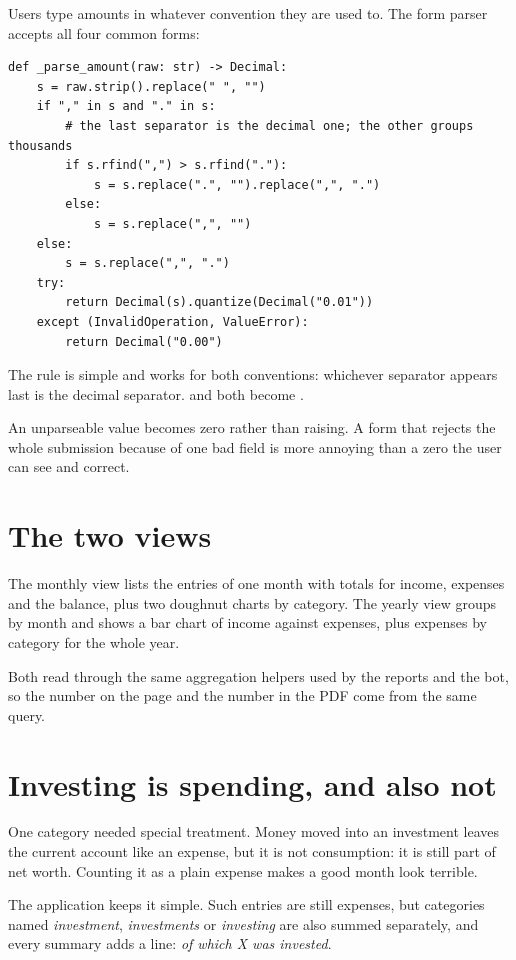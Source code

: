 Users type amounts in whatever convention they are used to. The form parser
accepts all four common forms:

\begin{lstlisting}[style=py]
def _parse_amount(raw: str) -> Decimal:
    s = raw.strip().replace(" ", "")
    if "," in s and "." in s:
        # the last separator is the decimal one; the other groups thousands
        if s.rfind(",") > s.rfind("."):
            s = s.replace(".", "").replace(",", ".")
        else:
            s = s.replace(",", "")
    else:
        s = s.replace(",", ".")
    try:
        return Decimal(s).quantize(Decimal("0.01"))
    except (InvalidOperation, ValueError):
        return Decimal("0.00")
\end{lstlisting}

The rule is simple and works for both conventions: whichever separator appears
last is the decimal separator.  and  both become
.

An unparseable value becomes zero rather than raising. A form that rejects the
whole submission because of one bad field is more annoying than a zero the user
can see and correct.

\section{The two views}

The monthly view lists the entries of one month with totals for income,
expenses and the balance, plus two doughnut charts by category. The yearly view
groups by month and shows a bar chart of income against expenses, plus expenses
by category for the whole year.

Both read through the same aggregation helpers used by the reports and the bot,
so the number on the page and the number in the PDF come from the same query.

\section{Investing is spending, and also not}

One category needed special treatment. Money moved into an investment leaves the
current account like an expense, but it is not consumption: it is still part of
net worth. Counting it as a plain expense makes a good month look terrible.

The application keeps it simple. Such entries are still expenses, but categories
named \emph{investment}, \emph{investments} or \emph{investing} are also summed
separately, and every summary adds a line: \emph{of which X was invested}.


